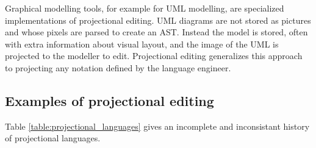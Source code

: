 Graphical modelling tools, for example for UML modelling, are specialized implementations of projectional editing.
UML diagrams are not stored as pictures and whose pixels are parsed to create an AST.
Instead the model is stored, often with extra information about visual layout, and the image of the UML is projected to the modeller to edit.
Projectional editing generalizes this approach to projecting any notation defined by the language engineer.

\subsection{Examples of projectional editing}

Table \ref{table:projectional_languages} gives an incomplete and inconsistant history of projectional languages.

